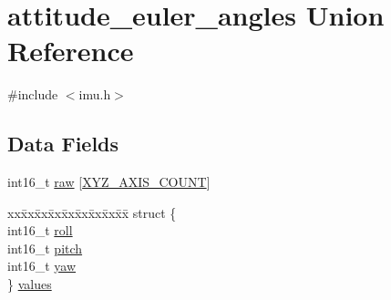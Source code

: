 \hypertarget{unionattitude__euler__angles}{\section{attitude\+\_\+euler\+\_\+angles Union Reference}
\label{unionattitude__euler__angles}
}


{\ttfamily \#include $<$imu.\+h$>$}

\subsection*{Data Fields}
\begin{DoxyCompactItemize}
\item 
int16\+\_\+t \hyperlink{unionattitude__euler__angles_a45438ed4a3ca5bbee83e583ae13555ab}{raw} \mbox{[}\hyperlink{axis_8h_a93ac071aee723ba4580dfc8b72ae847f}{X\+Y\+Z\+\_\+\+A\+X\+I\+S\+\_\+\+C\+O\+U\+N\+T}\mbox{]}
\item 
\begin{tabbing}
xx\=xx\=xx\=xx\=xx\=xx\=xx\=xx\=xx\=\kill
struct \{\\
\>int16\_t \hyperlink{unionattitude__euler__angles_a4a05156a49183b640c9469163c9251bb}{roll}\\
\>int16\_t \hyperlink{unionattitude__euler__angles_a9da89c8841a0d57f895cab39aaeb65a2}{pitch}\\
\>int16\_t \hyperlink{unionattitude__euler__angles_a04c710c64c84841c0f7326c95e4df0b4}{yaw}\\
\} \hyperlink{unionattitude__euler__angles_a0c093821e87d54c958c28d0f9d0058ee}{values}\\

\end{tabbing}\end{DoxyCompactItemize}


